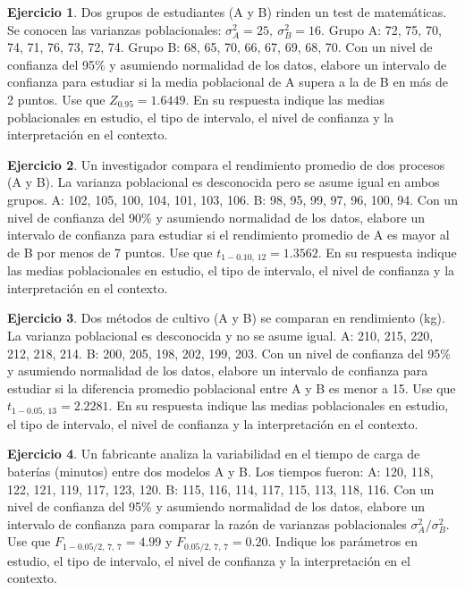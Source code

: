 \documentclass[
  11pt,
]{book}
\theoremstyle{definition}
\theoremstyle{definition}
\theoremstyle{definition}
\newtheorem{exercise}{Ejercicio}[chapter]
\theoremstyle{definition}
\theoremstyle{remark}
\begin{document}
\begin{exercise}
Dos grupos de estudiantes (A y B) rinden un test de matemáticas. Se conocen las varianzas poblacionales: \(\sigma_A^2 = 25,\ \sigma_B^2 = 16\). Grupo A: 72, 75, 70, 74, 71, 76, 73, 72, 74. Grupo B: 68, 65, 70, 66, 67, 69, 68, 70. Con un nivel de confianza del 95\% y asumiendo normalidad de los datos, elabore un intervalo de confianza para estudiar si la media poblacional de A supera a la de B en más de 2 puntos. Use que \(Z_{0.95} = 1.6449\). En su respuesta indique las medias poblacionales en estudio, el tipo de intervalo, el nivel de confianza y la interpretación en el contexto.
\end{exercise}

\begin{exercise}
Un investigador compara el rendimiento promedio de dos procesos (A y B). La varianza poblacional es desconocida pero se asume igual en ambos grupos. A: 102, 105, 100, 104, 101, 103, 106. B: 98, 95, 99, 97, 96, 100, 94. Con un nivel de confianza del 90\% y asumiendo normalidad de los datos, elabore un intervalo de confianza para estudiar si el rendimiento promedio de A es mayor al de B por menos de 7 puntos. Use que \(t_{1-0.10,\,12} = 1.3562\). En su respuesta indique las medias poblacionales en estudio, el tipo de intervalo, el nivel de confianza y la interpretación en el contexto.
\end{exercise}

\begin{exercise}
Dos métodos de cultivo (A y B) se comparan en rendimiento (kg). La varianza poblacional es desconocida y no se asume igual. A: 210, 215, 220, 212, 218, 214. B: 200, 205, 198, 202, 199, 203. Con un nivel de confianza del 95\% y asumiendo normalidad de los datos, elabore un intervalo de confianza para estudiar si la diferencia promedio poblacional entre A y B es menor a 15. Use que \(t_{1-0.05,\,13}=2.2281\). En su respuesta indique las medias poblacionales en estudio, el tipo de intervalo, el nivel de confianza y la interpretación en el contexto.
\end{exercise}

\begin{exercise}
Un fabricante analiza la variabilidad en el tiempo de carga de baterías (minutos) entre dos modelos A y B. Los tiempos fueron: A: 120, 118, 122, 121, 119, 117, 123, 120. B: 115, 116, 114, 117, 115, 113, 118, 116. Con un nivel de confianza del 95\% y asumiendo normalidad de los datos, elabore un intervalo de confianza para comparar la razón de varianzas poblacionales \(\sigma_A^2/\sigma_B^2\). Use que \(F_{1-0.05/2,\,7,\,7} = 4.99\) y \(F_{0.05/2,\,7,\,7} = 0.20\). Indique los parámetros en estudio, el tipo de intervalo, el nivel de confianza y la interpretación en el contexto.
\end{exercise}
\end{document}
